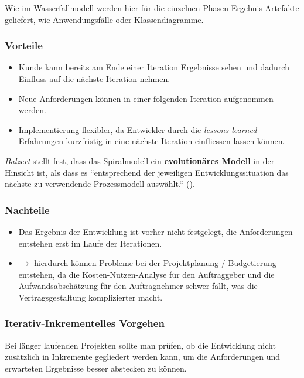 \noindent
Wie im Wasserfallmodell werden hier für die einzelnen Phasen Ergebnis-Artefakte geliefert, wie Anwendungsfälle oder Klassendiagramme.


\subsubsection*{Vorteile}

\begin{itemize}
    \item Kunde kann bereits am Ende einer Iteration Ergebnisse sehen und dadurch Einfluss auf die nächste Iteration nehmen.
    \item Neue Anforderungen können in einer folgenden Iteration aufgenommen werden.
    \item Implementierung flexibler, da Entwickler durch die \textit{lessons-learned} Erfahrungen kurzfristig in eine nächste Iteration einfliessen lassen können.
\end{itemize}

\noindent
\textit{Balzert} stellt fest, dass das Spiralmodell ein \textbf{evolutionäres Modell} in der Hinsicht ist, als dass es ``entsprechend der jeweiligen Entwicklungssituation das nächste zu verwendende Prozessmodell auswählt.`` (\cite[556]{Bal08}).

\subsubsection*{Nachteile}

\begin{itemize}
    \item Das Ergebnis der Entwicklung ist vorher nicht festgelegt, die Anforderungen entstehen erst im Laufe der Iterationen.
    \item[] $\rightarrow$ hierdurch können Probleme bei der Projektplanung / Budgetierung entstehen, da die Kosten-Nutzen-Analyse für den Auftraggeber und die Aufwandsabschätzung für den Auftragnehmer schwer fällt, was die Vertragsgestaltung komplizierter macht.
\end{itemize}

\subsubsection*{Iterativ-Inkrementelles Vorgehen}
Bei länger laufenden Projekten sollte man prüfen, ob die Entwicklung nicht zusätzlich in Inkremente gegliedert werden kann, um die Anforderungen und erwarteten Ergebnisse besser abstecken zu können.

